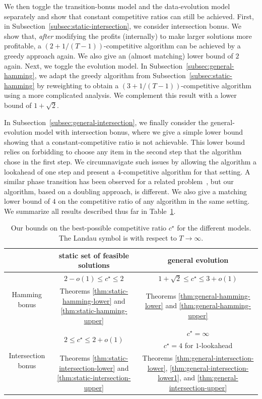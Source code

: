 \documentclass[a4paper]{book}
\newcommand{\finalversion}[1]{#1}
\begin{document}
We then toggle the transition-bonus model and the data-evolution model separately and show that constant competitive ratios can still be achieved. First, in Subsection~\ref{subsec:static-intersection}, we consider intersection bonus. We show that, \emph{after} modifying the profits \finalversion{(internally)} to make larger solutions more profitable, a $(2+1/(T-1))$-competitive algorithm can be achieved by a greedy approach again. We also give an (almost matching) lower bound of $2$ again. Next, we toggle the evolution model. In Subsection~\ref{subsec:general-hamming}, we adapt the greedy algorithm from Subsection~\ref{subsec:static-hamming} by reweighting to obtain a $(3+1/(T-1))$-competitive algorithm using a more complicated analysis. We complement this result with a lower bound of $1+\sqrt{2}$.

In Subsection~\ref{subsec:general-intersection}, we finally consider the general-evolution model with intersection bonus, where we give a simple lower bound showing that a constant-competitive ratio is not achievable. This lower bound relies on forbidding to choose any item in the second step that the algorithm chose in the first step. We circumnavigate such issues by allowing the algorithm a lookahead of one step and present a $4$-competitive algorithm for that setting. A similar phase transition has been observed for a related problem~\cite{Bampis+}, but our algorithm, based on a doubling approach, is different. We also give a matching lower bound of $4$ on the competitive ratio of any algorithm in the same setting. We summarize all results described thus far in Table~\ref{table:results}.



\begin{table}[t]
	\centering
	\def\arraystretch{1.1}
	\begin{tabular}{ccc}
		\toprule
		&static set of feasible solutions&general evolution\\
		\midrule
		\multirow{2}{*}{Hamming bonus}& \finalversion{$2-o(1)\leq c^\star\leq2$} & $1+\sqrt{2}\leq c^\star\leq3+o(1)$ \\
		&  Theorems \ref{thm:static-hamming-lower} and \ref{thm:static-hamming-upper} & Theorems \ref{thm:general-hamming-lower} and \ref{thm:general-hamming-upper}\\[1ex]  
		\midrule
		\multirow{3}{*}{Intersection bonus}& \multirow{2}{*}{$2\leq c^\star\leq 2+o(1)$} & $c^\star=\infty$\\
		& & $c^\star=4$ for $1$-lookahead\\		
		&  Theorems \ref{thm:static-intersection-lower} and \ref{thm:static-intersection-upper} & Theorems \ref{thm:general-intersection-lower}, \ref{thm:general-intersection-lower1}, and \ref{thm:general-intersection-upper} \\[1ex]  
		\bottomrule
	\end{tabular}
	\medskip
	\caption{Our bounds on the best-possible competitive ratio $c^\star$ for the different models. The Landau symbol is with respect to $T\rightarrow\infty$.}
	\label{table:results}
\end{table}
\end{document}
